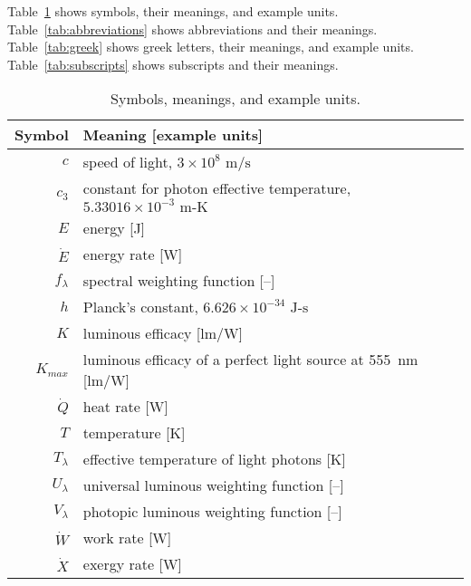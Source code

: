 
\noindent 
Table~\ref{tab:symbols} shows symbols, their meanings, and example units.
Table~\ref{tab:abbreviations} shows abbreviations and their meanings.
Table~\ref{tab:greek} shows greek letters, their meanings, and example units.
Table~\ref{tab:subscripts} shows subscripts and their meanings.


  
\begin{table}
\centering %
\caption{Symbols, meanings, and example units.}
\begin{tabular}{r l}
\toprule
Symbol & Meaning [example units] \\
\midrule
$c$ & speed of light, $3 \times 10^8 \text{ m/s}$ \\
$c_3$ & constant for photon effective temperature, $5.33016 \times 10^{-3} \text{ m-K}$ \\
$E$ & energy [J] \\
$\dot{E}$ & energy rate [W] \\
$f_\lambda$ & spectral weighting function [--] \\
$h$ & Planck's constant, $6.626 \times 10^{-34} \text{ J-s}$ \\
$K$ & luminous efficacy [lm/W] \\
$K_{max}$ & luminous efficacy of a perfect light source at 555~nm [lm/W] \\
$\dot{Q}$ & heat rate [W] \\
$T$ & temperature [K] \\
$T_\lambda$ & effective temperature of light photons [K] \\
$U_\lambda$ & universal luminous weighting function [--] \\
$V_\lambda$ & photopic luminous weighting function [--] \\
$\dot{W}$ & work rate [W] \\
$\dot{X}$ & exergy rate [W] \\
\bottomrule
\end{tabular}
\label{tab:symbols}
\end{table}


  
